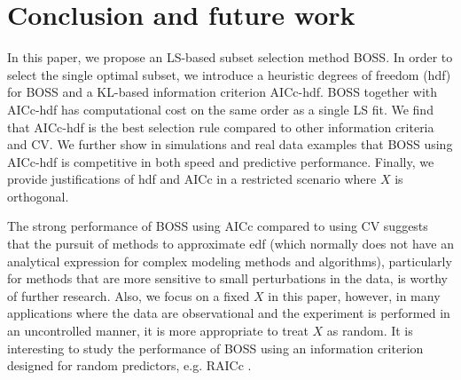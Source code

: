 \section{Conclusion and future work}
\label{sec:conclusion}
In this paper, we propose an LS-based subset selection method BOSS. In order to select the single optimal subset, we introduce a heuristic degrees of freedom (hdf) for BOSS and a KL-based information criterion AICc-hdf. BOSS together with AICc-hdf has computational cost on the same order as a single LS fit. We find that AICc-hdf is the best selection rule compared to other information criteria and CV. We further show in simulations and real data examples that BOSS using AICc-hdf is competitive in both speed and predictive performance. Finally, we provide justifications of hdf and AICc in a restricted scenario where $X$ is orthogonal.

The strong performance of BOSS using AICc compared to using CV suggests that the pursuit of methods to approximate edf (which normally does not have an analytical expression for complex modeling methods and algorithms), particularly for methods that are more sensitive to small perturbations in the data, is worthy of further research. Also, we focus on a fixed $X$ in this paper, however, in many applications where the data are observational and the experiment is performed in an uncontrolled manner, it is more appropriate to treat $X$ as random. It is interesting to study the performance of BOSS using an information criterion designed for random predictors, e.g. RAICc \citep{tian2020selection}.